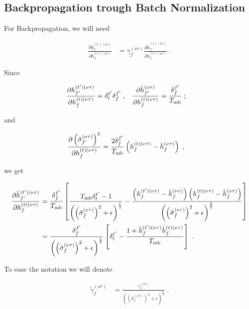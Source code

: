 \begin{subappendices}


\section{Backpropagation trough Batch Normalization}

For Backpropagation, we will need 

\begin{align}
\frac{\partial y^{(t')(\nu\tau)}_{f'}}{\partial h_{f}^{(t)(\nu\tau)}}&=
%
\gamma^{(\nu\tau)}_f\frac{\partial \tilde{h}_{f'}^{(t)(\nu\tau)}}{\partial h_{f}^{(t)(\nu\tau)}}\;.
\end{align}

Since

\begin{align}
\frac{\partial h^{(t')(\nu\tau)}_{f'}}{\partial h_{f}^{(t)(\nu\tau)}}&=\delta^{t'}_t\delta^{f'}_f\;,&
%
\frac{\partial \hat{h}_{f'}^{(\nu\tau)}}{\partial h_{f}^{(t)(\nu\tau)}}&=\frac{\delta^{f'}_f}{T_{{\rm mb}}}\:;
\end{align}

and

\begin{align}
\frac{\partial \left(\hat{\sigma}_{f'}^{(\nu\tau)}\right)^2}{\partial h_{f}^{(t)(\nu\tau)}}&=
%
\frac{2\delta^{f'}_f}{T_{{\rm mb}}}\left(h_{f}^{(t)(\nu\tau)}-\hat{h}_{f}^{(\nu\tau)}\right)\;,
\end{align}

we get

\begin{align}
\frac{\partial \tilde{h}_{f'}^{(t')(\nu\tau)}}{\partial h_{f}^{(t)(\nu\tau)}}&=
%
\frac{\delta^{f'}_f}{T_{{\rm mb}}}\left[\frac{T_{{\rm mb}}\delta^{t'}_t-1}
%
{\left(\left(\hat{\sigma}_{f}^{(\nu\tau)}\right)^2+\epsilon\right)^\frac12}-
%
\frac{\left(h_{f}^{(t')(\nu\tau)}-\hat{h}_{f}^{(\nu\tau)}\right)\left(h_{f}^{(t)(\nu\tau)}-\hat{h}_{f}^{(\nu\tau)}\right)}
%
{\left(\left(\hat{\sigma}_{f}^{(\nu\tau)}\right)^2+\epsilon\right)^\frac32}\right]\notag\\
%
&=\frac{\delta^{f'}_f}{\left(\left(\hat{\sigma}_{f}^{(\nu\tau)}\right)^2+\epsilon\right)^\frac12}
%
\left[\delta^{t'}_t-
%
\frac{1+\tilde{h}_{f}^{(t')(\nu\tau)}\tilde{h}_{f}^{(t)(\nu\tau)}}{T_{{\rm mb}}}\right]\;.
\end{align}

To ease the notation we will denote

\begin{align}
\tilde{\gamma}^{(\nu\tau)}_f&=
%
\frac{\gamma^{(\nu\tau)}_f}{\left(\left(\hat{\sigma}_{f}^{(\nu\tau)}\right)^2+\epsilon\right)^\frac12}\;.
\end{align}


\end{subappendices}
